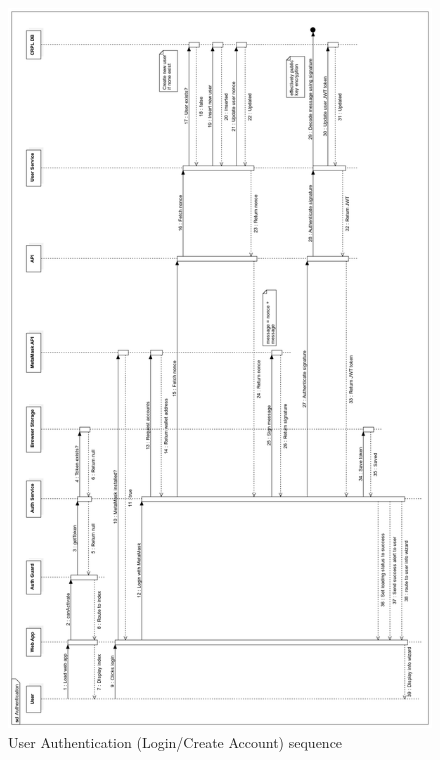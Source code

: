 \begin{figure}[H]
\caption{User Authentication (Login/Create Account) sequence}
\centering
\includegraphics[width=\textwidth,height=\textheight,keepaspectratio]{images/operational/Authentication}
\end{figure}

